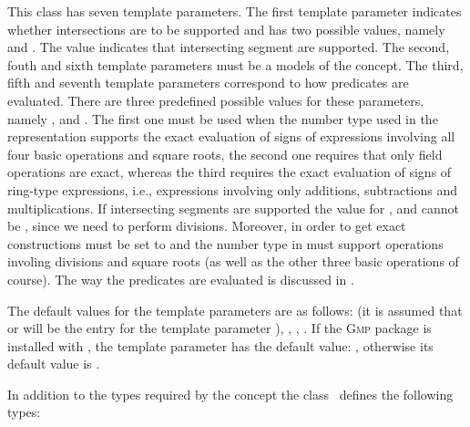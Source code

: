 \begin{ccRefClass}
This class has seven template parameters. The first template parameter
indicates whether intersections are to be supported and has two
possible values, namely  and
. The value  indicates that
intersecting segment are supported. The second, fouth and sixth
template parameters must be a models of the  concept. The
third, fifth and seventh template parameters correspond to how
predicates are evaluated. There are three predefined possible values for
these parameters, namely ,
 and . The first one must be
used when the number type used in the representation supports the
exact evaluation of signs of expressions involving all four basic
operations and square roots, the second one requires that only field
operations are exact, whereas the third requires the exact
evaluation of signs of ring-type expressions, i.e., expressions
involving only additions, subtractions and multiplications. If
intersecting segments are supported the value for , 
and  cannot be , since we need to perform
divisions. Moreover, in order to get exact constructions 
must be set to  and the number type in
 must support operations involing divisions and square roots
(as well as the other three basic operations of course).
%
The way the predicates are evaluated is discussed in
\cite{b-ecvdl-96,k-peasv-04}.

The default values for the template parameters are as follows:
 (it is assumed that
 or 
will be the entry for the template parameter ), 
,
,
. If the \textsc{Gmp} package is
installed with \cgal, the template parameter  has the default
value: , otherwise its
default value is
.



\ccIsModel
{}

\ccTypes
In addition to the types required by the
 concept the class \ccRefName\
defines the following types:


\end{ccRefClass}
